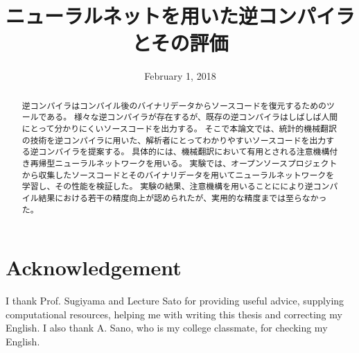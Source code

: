\documentclass[11pt]{jarticle}
\title{ニューラルネットを用いた逆コンパイラとその評価}
\date{February 1, 2018}
\begin{document}

\begin{abstract}
逆コンパイラはコンパイル後のバイナリデータからソースコードを復元するためのツールである。
様々な逆コンパイラが存在するが、既存の逆コンパイラはしばしば人間にとって分かりにくいソースコードを出力する。
そこで本論文では、統計的機械翻訳の技術を逆コンパイラに用いた、解析者にとってわかりやすいソースコードを出力する逆コンパイラを提案する。
具体的には、機械翻訳において有用とされる注意機構付き再帰型ニューラルネットワークを用いる。
実験では、オープンソースプロジェクトから収集したソースコードとそのバイナリデータを用いてニューラルネットワークを学習し、その性能を検証した。
実験の結果、注意機構を用いることににより逆コンパイル結果における若干の精度向上が認められたが、実用的な精度までは至らなかった。
\end{abstract}



\maketitle

\chapter*{Acknowledgement}
I thank Prof. Sugiyama and Lecture Sato for providing useful advice, supplying computational resources, helping me with writing this thesis and 
correcting my English.
I also thank A. Sano, who is my college classmate, for checking my English.
\end{document}
